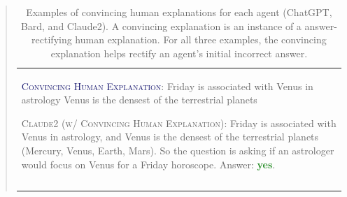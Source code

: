 \documentclass[11pt]{article}
\begin{document}
\begin{abstract}
\begin{table}[!ht]
\begin{tabularx}{\textwidth}{X}
\textcolor{MidnightBlue}{\textsc{Convincing Human Explanation}}: Friday is associated with Venus in astrology Venus is the densest of the terrestrial planets

\textcolor{WildStrawberry}{\textsc{Claude2 (w/ Convincing Human Explanation)}}:
Friday is associated with Venus in astrology, and Venus is the densest of the terrestrial planets (Mercury, Venus, Earth, Mars). So the question is asking if an astrologer would focus on Venus for a Friday horoscope. Answer: \textcolor{ForestGreen}{\textbf{yes}}.
\\
\\[-1.5ex]
\Xhline{2\arrayrulewidth}
\end{tabularx}
\caption{Examples of convincing human explanations for each agent (ChatGPT, Bard, and Claude2). A convincing explanation is an instance of a answer-rectifying human explanation. For all three examples, the convincing explanation helps rectify an agent's initial incorrect answer.}
\label{tab:concincing_demo}
\end{table}


\end{abstract}
\end{document}
